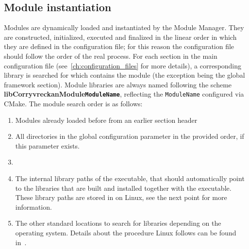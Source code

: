\subsection{Module instantiation}
\label{sec:module_instantiation}
Modules are dynamically loaded and instantiated by the Module Manager.
They are constructed, initialized, executed and finalized in the linear order in which they are defined in the configuration file; for this reason the configuration file should follow the order of the real process.
For each section in the main configuration file (see~\ref{ch:configuration_files} for more details), a corresponding library is searched for which contains the module (the exception being the global framework section).
Module libraries are always named following the scheme \textbf{libCorryvreckanModule\texttt{ModuleName}}, reflecting the \texttt{ModuleName} configured via CMake.
The module search order is as follows:
\begin{enumerate}
\item Modules already loaded before from an earlier section header
\item All directories in the global configuration parameter  in the provided order, if this parameter exists.
\item \item The internal library paths of the executable, that should automatically point to the libraries that are built and installed together with the executable.
These library paths are stored in  on Linux, see the next point for more information.
\item The other standard locations to search for libraries depending on the operating system.
Details about the procedure Linux follows can be found in~\cite{linuxld}.
\end{enumerate}

